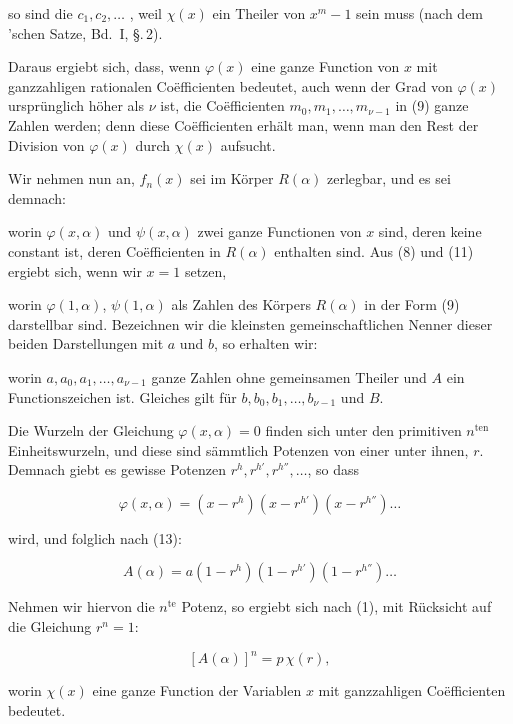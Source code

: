 so sind die $c_1, c_2, \ldots$ , weil $\chi(x)$ ein Theiler von $x^m - 1$ sein muss (nach dem 'schen Satze, Bd.~I, \S.\,2).

Daraus ergiebt sich, dass, wenn $\varphi(x)$ eine ganze Function von $x$ mit ganzzahligen rationalen Coëfficienten bedeutet, auch wenn der Grad von $\varphi(x)$ ursprünglich höher als $\nu$ ist, die Coëfficienten $m_0, m_1, \ldots, m_{\nu-1}$ in (9) ganze Zahlen werden; denn diese Coëfficienten erhält man, wenn man den Rest der Division von $\varphi(x)$ durch $\chi(x)$ aufsucht.

Wir nehmen nun an, $f_n(x)$ sei im Körper $R(\alpha)$ zerlegbar, und es sei demnach:


worin $\varphi(x,\alpha)$ und $\psi(x,\alpha)$ zwei ganze Functionen von $x$ sind, deren keine constant ist, deren Coëfficienten in $R(\alpha)$ enthalten sind. Aus (8) und (11) ergiebt sich, wenn wir $x=1$ setzen,


worin $\varphi(1,\alpha)$, $\psi(1,\alpha)$ als Zahlen des Körpers $R(\alpha)$ in der Form (9) darstellbar sind. Bezeichnen wir die kleinsten gemeinschaftlichen Nenner dieser beiden Darstellungen mit $a$ und $b$, so erhalten wir:


worin $a, a_0, a_1, \ldots, a_{\nu-1}$ ganze Zahlen ohne gemeinsamen Theiler und $A$ ein Functionszeichen ist. Gleiches gilt für $b, b_0, b_1, \ldots, b_{\nu-1}$ und $B$.

Die Wurzeln der Gleichung $\varphi(x,\alpha) = 0$ finden sich unter den primitiven $n^{\text{ten}}$ Einheitswurzeln, und diese sind sämmtlich Potenzen von einer unter ihnen, $r$. Demnach giebt es gewisse Potenzen $r^h, r^{h'}, r^{h''}, \ldots$, so dass

\[
\varphi(x,\alpha) = (x - r^h)(x - r^{h'})(x - r^{h''}) \ldots
\]

wird, und folglich nach (13):

\[
A(\alpha) = a(1 - r^h)(1 - r^{h'})(1 - r^{h''}) \ldots
\]

Nehmen wir hiervon die $n^{\text{te}}$ Potenz, so ergiebt sich nach (1), mit Rücksicht auf die Gleichung $r^n = 1$:

\[
[A(\alpha)]^n = p\,\chi(r),
\]

worin $\chi(x)$ eine ganze Function der Variablen $x$ mit ganzzahligen Coëfficienten bedeutet.

